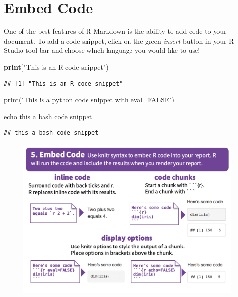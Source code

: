 \documentclass[]{book}
\newenvironment{Shaded}{\begin{snugshade}}{\end{snugshade}}
\newcommand{\KeywordTok}[1]{\textcolor[rgb]{0.13,0.29,0.53}{\textbf{#1}}}
\newcommand{\StringTok}[1]{\textcolor[rgb]{0.31,0.60,0.02}{#1}}
\newcommand{\BuiltInTok}[1]{#1}
\newcommand{\NormalTok}[1]{#1}
\begin{document}
\section{Embed Code}\label{embed-code}

One of the best features of R Markdown is the ability to add code to
your document. To add a code snippet, click on the green \emph{insert}
button in your R Studio tool bar and choose which language you would
like to use!

\begin{Shaded}
\begin{Highlighting}[]
\KeywordTok{print}\NormalTok{(}\StringTok{"This is an R code snippet"}\NormalTok{)}
\end{Highlighting}
\end{Shaded}

\begin{verbatim}
## [1] "This is an R code snippet"
\end{verbatim}

\begin{Shaded}
\begin{Highlighting}[]
\BuiltInTok{print}\NormalTok{(}\StringTok{"This is a python code snippet with eval=FALSE"}\NormalTok{)}
\end{Highlighting}
\end{Shaded}

\begin{Shaded}
\begin{Highlighting}[]
\BuiltInTok{echo}\NormalTok{ this a bash code snippet}
\end{Highlighting}
\end{Shaded}

\begin{verbatim}
## this a bash code snippet
\end{verbatim}

\begin{figure}
\centering
\includegraphics{images/code.png}
\caption{}
\end{figure}
\end{document}
